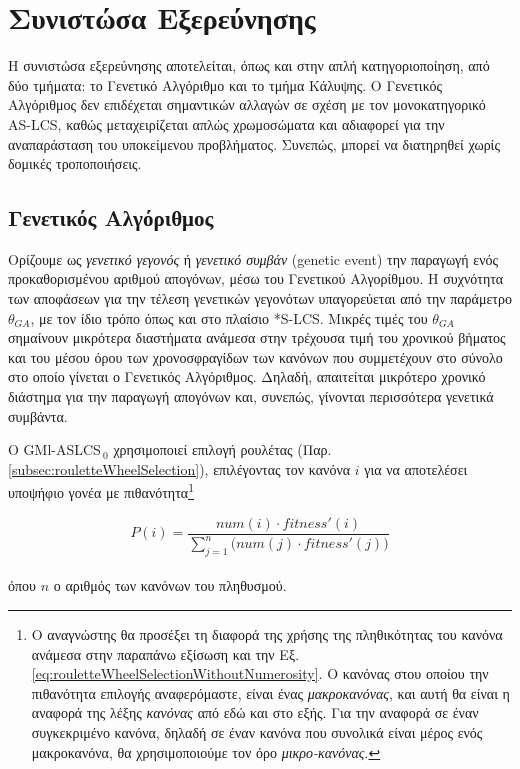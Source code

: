 \section{Συνιστώσα Εξερεύνησης}
\label{sec:multiLabelExploration}
Η συνιστώσα εξερεύνησης αποτελείται, όπως και στην απλή κατηγοριοποίηση, από δύο τμήματα: το Γενετικό Αλγόριθμο και το τμήμα Κάλυψης. Ο Γενετικός Αλγόριθμος δεν επιδέχεται σημαντικών αλλαγών σε σχέση με τον μονοκατηγορικό AS-LCS, καθώς μεταχειρίζεται απλώς χρωμοσώματα και αδιαφορεί για την αναπαράσταση του υποκείμενου προβλήματος. Συνεπώς, μπορεί να διατηρηθεί χωρίς δομικές τροποποιήσεις. 

\subsection{Γενετικός Αλγόριθμος}
\label{subsec:gmlaslcs0GA}
Ορίζουμε ως \emph{γενετικό γεγονός} ή \emph{γενετικό συμβάν} (genetic event) την παραγωγή ενός προκαθορισμένου αριθμού απογόνων, μέσω του Γενετικού Αλγορίθμου. Η συχνότητα των αποφάσεων για την τέλεση γενετικών γεγονότων υπαγορεύεται από την παράμετρο $\theta_{GA}$, με τον ίδιο τρόπο όπως και στο πλαίσιο *S-LCS. Μικρές τιμές του $\theta_{GA}$ σημαίνουν μικρότερα διαστήματα ανάμεσα στην τρέχουσα τιμή του χρονικού βήματος και του μέσου όρου των χρονοσφραγίδων των κανόνων που συμμετέχουν στο σύνολο στο οποίο γίνεται ο Γενετικός Αλγόριθμος. Δηλαδή, απαιτείται μικρότερο χρονικό διάστημα για την παραγωγή απογόνων και, συνεπώς, γίνονται περισσότερα γενετικά συμβάντα.

Ο GMl-ASLCS$_{\:0}$ χρησιμοποιεί επιλογή ρουλέτας (Παρ. \ref{subsec:rouletteWheelSelection}), επιλέγοντας τον κανόνα $i$ για να αποτελέσει υποψήφιο γονέα με πιθανότητα\footnote{Ο αναγνώστης θα προσέξει τη διαφορά της χρήσης της πληθικότητας του κανόνα ανάμεσα στην παραπάνω εξίσωση και την Εξ. \ref{eq:rouletteWheelSelectionWithoutNumerosity}. Ο κανόνας στου οποίου την πιθανότητα επιλογής αναφερόμαστε, είναι ένας \emph{μακροκανόνας}, και αυτή θα είναι η αναφορά της λέξης \emph{κανόνας} από εδώ και στο εξής. Για την αναφορά σε έναν συγκεκριμένο κανόνα, δηλαδή σε έναν κανόνα που συνολικά είναι μέρος ενός μακροκανόνα, θα χρησιμοποιούμε τον όρο \emph{μικρο-κανόνας}.}

\begin{equation}
\label{eq:rouletteWheelSelectionGMlASLCS}
P(i) = \frac{num(i) \cdot fitness'(i)}{\sum\limits_{j=1}^n \big(num(j) \cdot fitness'(j)\big)}
\end{equation}
\\
όπου $n$ ο αριθμός των κανόνων του πληθυσμού.

